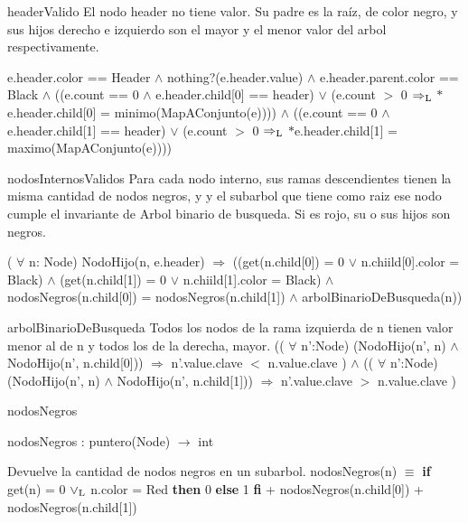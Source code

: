 \begin{DoxyParagraph}{header\-Valido}
\-El nodo header no tiene valor. \-Su padre es la raíz, de color negro, y sus hijos derecho e izquierdo son el mayor y el menor valor del arbol respectivamente.\par

\end{DoxyParagraph}
e.\-header.\-color == \-Header $\land$ nothing?(e.\-header.\-value) $\land$ e.\-header.\-parent.\-color == \-Black $\land$ ((e.\-count == 0 $\land$ e.\-header.\-child\mbox{[}0\mbox{]} == header) $\lor$ (e.\-count $>$ 0 $\Rightarrow_{\rm L}$ $\ast$e.header.\-child\mbox{[}0\mbox{]} = minimo(\-Map\-A\-Conjunto(e)))) $\land$ ((e.\-count == 0 $\land$ e.\-header.\-child\mbox{[}1\mbox{]} == header) $\lor$ (e.\-count $>$ 0 $\Rightarrow_{\rm L}$ $\ast$e.header.\-child\mbox{[}1\mbox{]} = maximo(\-Map\-A\-Conjunto(e)))) 

\begin{DoxyParagraph}{nodos\-Internos\-Validos}
\-Para cada nodo interno, sus ramas descendientes tienen la misma cantidad de nodos negros, y y el subarbol que tiene como raiz ese nodo cumple el invariante de \-Arbol binario de busqueda. \-Si es rojo, su o sus hijos son negros.
\end{DoxyParagraph}
( $\forall$ n\-: \-Node) \-Nodo\-Hijo(n, e.\-header) $\Rightarrow$ ((get(n.\-child\mbox{[}0\mbox{]}) = 0 $\lor$ n.\-chiild\mbox{[}0\mbox{]}.color = \-Black) $\land$ (get(n.\-child\mbox{[}1\mbox{]}) = 0 $\lor$ n.\-chiild\mbox{[}1\mbox{]}.color = \-Black) $\land$ nodos\-Negros(n.\-child\mbox{[}0\mbox{]}) = nodos\-Negros(n.\-child\mbox{[}1\mbox{]}) $\land$ arbol\-Binario\-De\-Busqueda(n)) 

\begin{DoxyParagraph}{arbol\-Binario\-De\-Busqueda}
\-Todos los nodos de la rama izquierda de n tienen valor menor al de n y todos los de la derecha, mayor. (( $\forall$ n'\-:\-Node) (\-Nodo\-Hijo(n', n) $\land$ \-Nodo\-Hijo(n', n.\-child\mbox{[}0\mbox{]})) $\Rightarrow$ n'.value.\-clave $<$ n.\-value.\-clave ) $\land$ (( $\forall$ n'\-:\-Node) (\-Nodo\-Hijo(n', n) $\land$ \-Nodo\-Hijo(n', n.\-child\mbox{[}1\mbox{]})) $\Rightarrow$ n'.value.\-clave $>$ n.\-value.\-clave ) 
\end{DoxyParagraph}
\begin{DoxyParagraph}{nodos\-Negros}

\end{DoxyParagraph}
nodos\-Negros \-: puntero(\-Node) $\to$ int\par
 \-Devuelve la cantidad de nodos negros en un subarbol. nodos\-Negros(n) $\equiv$ {\bfseries if} get(n) = 0 $\lor_{\rm L}$ n.\-color = \-Red {\bfseries then} 0 {\bfseries else} 1 {\bfseries fi} + nodos\-Negros(n.\-child\mbox{[}0\mbox{]}) + nodos\-Negros(n.\-child\mbox{[}1\mbox{]}) 

